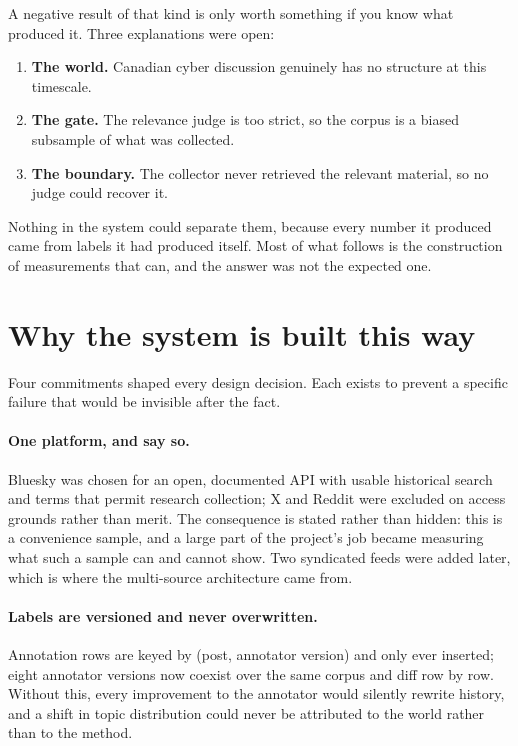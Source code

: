 \documentclass[11pt]{article}
\begin{document}
A negative result of that kind is only worth something if you know what
produced it. Three explanations were open:

\begin{enumerate}[leftmargin=1.4em,itemsep=2pt]
\item \textbf{The world.} Canadian cyber discussion genuinely has no structure
      at this timescale.
\item \textbf{The gate.} The relevance judge is too strict, so the corpus is a
      biased subsample of what was collected.
\item \textbf{The boundary.} The collector never retrieved the relevant
      material, so no judge could recover it.
\end{enumerate}

Nothing in the system could separate them, because every number it produced
came from labels it had produced itself. Most of what follows is the
construction of measurements that can, and the answer was not the expected one.

\section{Why the system is built this way}

Four commitments shaped every design decision. Each exists to prevent a
specific failure that would be invisible after the fact.

\paragraph{One platform, and say so.}
Bluesky was chosen for an open, documented API with usable historical search
and terms that permit research collection; X and Reddit were excluded on access
grounds rather than merit. The consequence is stated rather than hidden: this
is a convenience sample, and a large part of the project's job became measuring
what such a sample can and cannot show. Two syndicated feeds were added later,
which is where the multi-source architecture came from.

\paragraph{Labels are versioned and never overwritten.}
Annotation rows are keyed by (post, annotator version) and only ever inserted;
eight annotator versions now coexist over the same corpus and diff row by row.
Without this, every improvement to the annotator would silently rewrite
history, and a shift in topic distribution could never be attributed to the
world rather than to the method.
\end{document}
